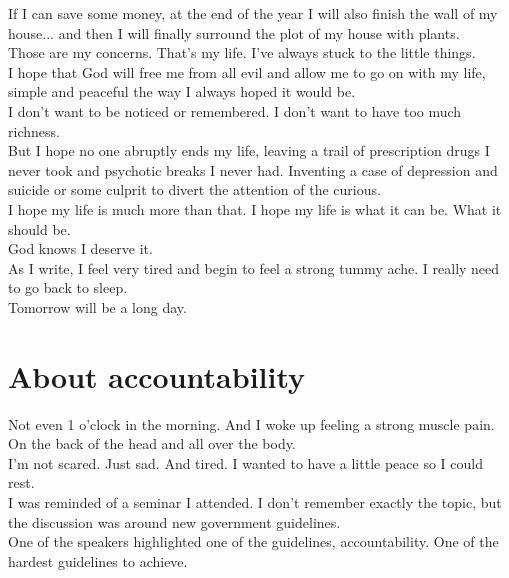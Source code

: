 \documentclass[11pt]{book}
\begin{document}
\noindent If I can save some money, at the end of the year I will also finish the wall of my house... and then I will finally surround the plot of my house with plants. \\ 

\noindent Those are my concerns. That's my life. I've always stuck to the little things. \\

\noindent I hope that God will free me from all evil and allow me to go on with my life, simple and peaceful the way I always hoped it would be. \\

\noindent I don't want to be noticed or remembered. I don't want to have too much richness. \\

\noindent But I hope no one abruptly ends my life, leaving a trail of prescription drugs I never took and psychotic breaks I never had. Inventing a case of depression and suicide or some culprit to divert the attention of the curious. \\ 

\noindent I hope my life is much more than that. I hope my life is what it can be. What it should be. \\

\noindent God knows I deserve it. \\

\noindent As I write, I feel very tired and begin to feel a strong tummy ache. I really need to go back to sleep.  \\

\noindent Tomorrow will be a long day.

\chapter{About accountability}

\noindent Not even 1 o'clock in the morning. And I woke up feeling a strong muscle pain. On the back of the head and all over the body. \\

\noindent I'm not scared. Just sad. And tired. I wanted to have a little peace so I could rest. \\

\noindent I was reminded of a seminar I attended. I don't remember exactly the topic, but the discussion was around new government guidelines. \\

\noindent One of the speakers highlighted one of the guidelines, accountability. One of the hardest guidelines to achieve. \\
\end{document}
